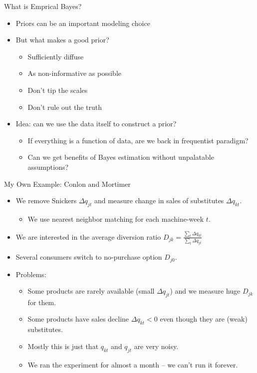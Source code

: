 \documentclass[xcolor=pdftex,dvipsnames,table,mathserif,aspectratio=169]{beamer}
\begin{document}
\begin{frame}{What is Emprical Bayes?}
\begin{itemize}
\item Priors can be an important modeling choice
\item But what makes a good prior?
\begin{itemize}
\item Sufficiently diffuse
\item As non-informative as possible
\item Don't tip the scales
\item Don't rule out the truth
\end{itemize}
\item Idea: can we use the data itself to construct a prior?
\begin{itemize}
\item If everything is a function of data, are we back in frequentist paradigm?
\item Can we get benefits of Bayes estimation without unpalatable assumptions?
\end{itemize}
\end{itemize}
\end{frame}


\begin{frame}{My Own Example: Conlon and Mortimer}
\begin{itemize}
\item We remove Snickers $\Delta q_{jt}$ and measure change in sales of substitutes $\Delta q_{kt}$. 
\begin{itemize}
\item We use nearest neighbor matching for each machine-week $t$.
\end{itemize}
\item We are interested in the average diversion ratio $D_{jk} = \frac{\sum_t \Delta q_{kt} }{\sum_{t}\Delta q_{jt}}$
\item Several consumers switch to no-purchase option $D_{j0}$.
\item Problems:
\begin{itemize}
\item Some products are rarely available (small $\Delta q_{jt}$) and we measure huge $D_{jk}$ for them.
\item Some products have sales decline $\Delta q_{kt} < 0$ even though they are (weak) substitutes.
\item Mostly this is just that $q_{kt}$ and $q_{jt}$ are very noisy.
\item We ran the experiment for almost a month -- we can't run it forever.
\end{itemize}
\end{itemize}
\end{frame}
\end{document}
